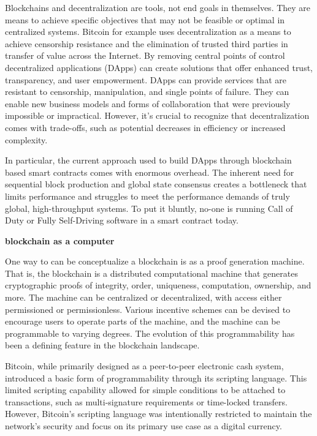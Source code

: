 \documentclass{article}
\begin{document}
Blockchains and decentralization are tools, not end goals in themselves. They are means to achieve specific objectives that may not be feasible or optimal in centralized systems. Bitcoin for example uses decentralization as a means to achieve censorship resistance and the elimination of trusted third parties in transfer of value across the Internet. By removing central points of control decentralized applications (DApps) can create solutions that offer enhanced trust, transparency, and user empowerment. DApps can provide services that are resistant to censorship, manipulation, and single points of failure. They can enable new business models and forms of collaboration that were previously impossible or impractical. However, it's crucial to recognize that decentralization comes with trade-offs, such as potential decreases in efficiency or increased complexity.
\vspace{2mm}

In particular, the current approach used to build DApps through blockchain based smart contracts comes with enormous overhead. The inherent need for sequential block production and global state consensus creates a bottleneck that limits performance and struggles to meet the performance demands of truly global, high-throughput systems. To put it bluntly, no-one is running Call of Duty or Fully Self-Driving software in a smart contract today.

\vspace{2mm}
\textbf{blockchain as a computer}
\vspace{2mm}

One way to  can be conceptualize a blockchain is as a proof generation machine. That is, the blockchain is a distributed computational machine that generates cryptographic proofs of  integrity, order, uniqueness, computation, ownership, and more. The machine can be centralized or decentralized, with access either permissioned or permissionless. Various incentive schemes can be devised to encourage users to operate parts of the machine, and the machine can be programmable to varying degrees. The evolution of this programmability has been a defining feature in the blockchain landscape.
\vspace{2mm}

Bitcoin, while primarily designed as a peer-to-peer electronic cash system, introduced a basic form of programmability through its scripting language. This limited scripting capability allowed for simple conditions to be attached to transactions, such as multi-signature requirements or time-locked transfers. However, Bitcoin's scripting language was intentionally restricted to maintain the network's security and focus on its primary use case as a digital currency.
\end{document}
